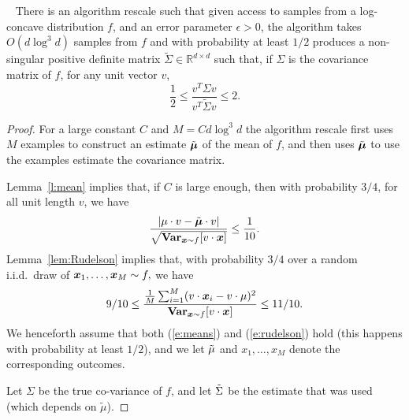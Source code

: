 \begin{lemma}~\label{lem:scaling}
There is an algorithm \textsf{rescale} such that given
access to samples from a log-concave distribution $f$, and an error
parameter $\epsilon>0$, the algorithm takes $O(d \log^3 d)$ samples
from $f$ and with probability at least $1/2$
produces a non-singular positive definite matrix $\tilde{\Sigma} \in \mathbb{R}^{d \times d}$
such that, if $\Sigma$ is the covariance matrix of $f$, 
for any unit vector $v$, 
\[
\frac{1}{2} \leq \frac{v^{T} \Sigma v}{v^T \tilde{\Sigma} v} 
   \leq 2.
\]
\end{lemma}
\begin{proof}
For a large constant $C$ and $M = C d \log^3 d$
the algorithm \textsf{rescale} first uses $M$ examples to
construct an estimate $\tilde{\boldsymbol{\mu}}$ of the mean of $f$, and then
uses $\tilde{\boldsymbol{\mu}}$ to use the examples estimate the covariance matrix.

Lemma~\ref{l:mean} implies that, if $C$ is large enough, then 
with probability $3/4$, for all unit length $v$, we have
\begin{equation}
\label{e:means}
\frac{| \mu \cdot v - \tilde{\boldsymbol{\mu}} \cdot v|}
     {\sqrt{\operatorname{{\bf Var}}_{\boldsymbol{x} \sim f}[v \cdot \boldsymbol{x}]}}
   \leq 
   \frac{1}{10}.
\end{equation}
Lemma~\ref{lem:Rudelson} implies that, with probability $3/4$ over a random i.i.d.~draw of $\boldsymbol{x}_1,\dots,\boldsymbol{x}_M \sim f,$ we have
\begin{equation}
\label{e:rudelson}
9/10 \leq \frac{\frac{1}{M} \sum_{i=1}^{M} (v \cdot \boldsymbol{x}_i - v \cdot \mu)^2}
           {\operatorname{{\bf Var}}_{\boldsymbol{x} \sim f} [v \cdot \boldsymbol{x}]} 
     \leq 11/10.
\end{equation}
We henceforth assume that both (\ref{e:means}) and (\ref{e:rudelson}) hold (this happens with probability at least $1/2$), and we let $\tilde{\mu}$ and $x_1,\dots,x_M$ denote the corresponding outcomes.

Let $\Sigma$ be the true co-variance of $f$, 
and let $\tilde{\Sigma}$
be the estimate that was used (which depends on $\tilde{\mu}$).


\end{proof}
